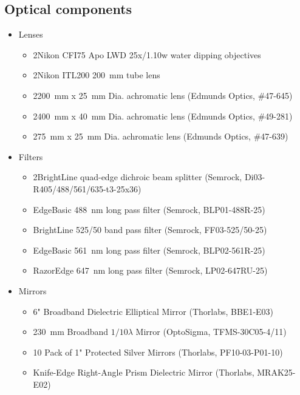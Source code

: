 \begin{singlespace}
\subsection*{Optical components}
  \begin{itemize}
    \item Lenses
    \begin{itemize}
      \item 2\texttimes Nikon CFI75 Apo LWD 25x/1.10w water dipping objectives
      \item 2\texttimes Nikon ITL200 \SI{200}{mm} tube lens
      \item 2\texttimes \SI{200}{mm} x \SI{25}{mm} Dia. achromatic lens (Edmunds Optics, \#47-645)
      \item 2\texttimes \SI{400}{mm} x \SI{40}{mm} Dia. achromatic lens (Edmunds Optics, \#49-281)
      \item 2\texttimes \SI{75}{mm} x \SI{25}{mm} Dia. achromatic lens (Edmunds Optics, \#47-639)
    \end{itemize}
    \item Filters
    \begin{itemize}
      \item 2\texttimes BrightLine quad-edge dichroic beam splitter (Semrock, Di03-R405/488/561/635-t3-25x36)
      \item EdgeBasic \SI{488}{nm} long pass filter (Semrock, BLP01-488R-25)
      \item BrightLine 525/50 band pass filter (Semrock, FF03-525/50-25)
      \item EdgeBasic \SI{561}{nm} long pass filter (Semrock, BLP02-561R-25)
      \item RazorEdge \SI{647}{nm} long pass filter (Semrock, LP02-647RU-25)
    \end{itemize}
    \item Mirrors
    \begin{itemize}
      \item 6" Broadband Dielectric Elliptical Mirror (Thorlabs, BBE1-E03)
      \item 2\texttimes \SI{30}{mm} Broadband $1/10 \lambda$ Mirror (OptoSigma, TFMS-30C05-4/11)
      \item 10 Pack of 1" Protected Silver Mirrors (Thorlabs, PF10-03-P01-10)
      \item Knife-Edge Right-Angle Prism Dielectric Mirror (Thorlabs, MRAK25-E02)
    \end{itemize}
  \end{itemize}


\end{singlespace}
